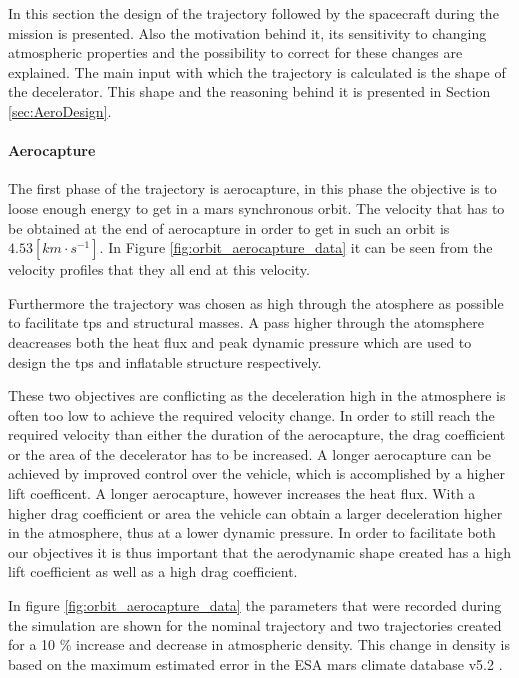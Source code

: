 In this section the design of the trajectory followed by the spacecraft during the mission is presented. Also the motivation behind it, its sensitivity to changing atmospheric properties and the possibility to correct for these changes are explained. The main input with which the trajectory is calculated is the shape of the decelerator. This shape and the reasoning behind it is presented in Section \ref{sec:AeroDesign}.

\paragraph{Aerocapture}
The first phase of the trajectory is aerocapture, in this phase the objective is to loose enough energy to get in a mars synchronous orbit. The velocity that has to be obtained at the end of aerocapture in order to get in such an orbit is $4.53 \left[km \cdot s^{-1}\right]$. In Figure \ref{fig:orbit_aerocapture_data} it can be seen from the velocity profiles that they all end at this velocity.

Furthermore the trajectory was chosen as high through the atosphere as possible to facilitate \gls{tps} and structural masses. A pass higher through the atomsphere deacreases both the heat flux and peak dynamic pressure which are used to design the \gls{tps} and inflatable structure respectively.

These two objectives are conflicting as the deceleration high in the atmosphere is often too low to achieve the required velocity change. In order to still reach the required velocity than either the duration of the aerocapture, the drag coefficient or the area of the decelerator has to be increased. A longer aerocapture can be achieved by improved control over the vehicle, which is accomplished by a higher lift coefficent.  A longer aerocapture, however increases the heat flux. With a higher drag coefficient or area the vehicle can obtain a larger deceleration higher in the atmosphere, thus at a lower dynamic pressure. In order to facilitate both our objectives it is thus important that the aerodynamic shape created has a high lift coefficient as well as a high drag coefficient.

In figure \ref{fig:orbit_aerocapture_data} the parameters that were recorded during the simulation are shown for the nominal trajectory and two trajectories created for a 10 \% increase and decrease in atmospheric density. This change in density is based on the maximum estimated error in the ESA mars climate database v5.2 \cite{Lewis2015}.

